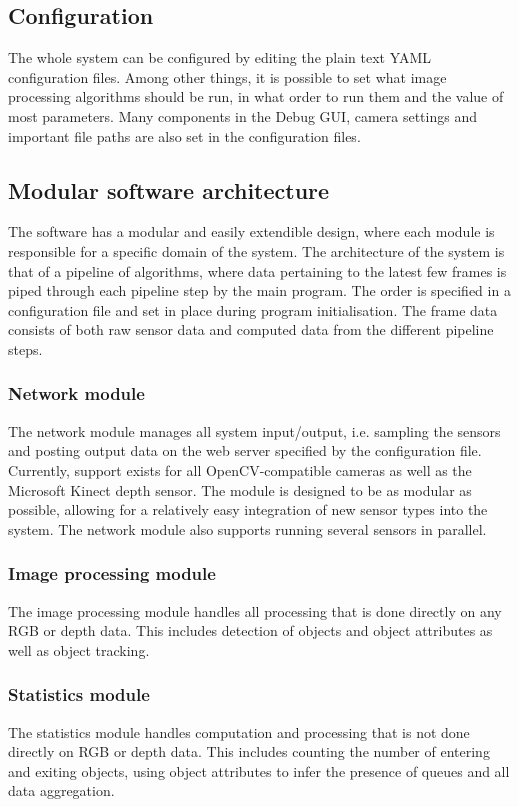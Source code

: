 \subsection{Configuration}
The whole system can be configured by editing the plain text YAML configuration files. Among other things, it is possible to set what image processing algorithms should be run, in what order to run them and the value of most parameters. Many components in the Debug GUI, camera settings and important file paths are also set in the configuration files. 

\subsection{Modular software architecture}
The software has a modular and easily extendible design, where each module is responsible for a specific domain of the system. The architecture of the system is that of a pipeline of algorithms, where data pertaining to the latest few frames is piped through each pipeline step by the main program. The order is specified in a configuration file and set in place during program initialisation. The frame data consists of both raw sensor data and computed data from the different pipeline steps. 

\subsubsection{Network module}
The network module manages all system input/output, i.e. sampling the sensors and posting output data on the web server specified by the configuration file. Currently, support exists for all OpenCV-compatible cameras as well as the Microsoft Kinect depth sensor. The module is designed to be as modular as possible, allowing for a relatively easy integration of new sensor types into the system. The network module also supports running several sensors in parallel. 

\subsubsection{Image processing module}
The image processing module handles all processing that is done directly on any RGB or depth data. This includes detection of objects and object attributes as well as object tracking.

\subsubsection{Statistics module}
The statistics module handles computation and processing that is not done directly on RGB or depth data. This includes counting the number of entering and exiting objects, using object attributes to infer the presence of queues and all data aggregation. 

